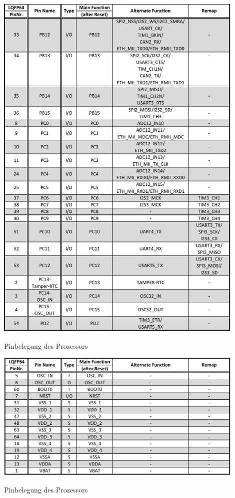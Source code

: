 \begin{table}[H]\ContinuedFloat
    \centering
    \includegraphics[width=0.9\textwidth]{Schuh/Pictures/Pinbelegung3}
    \caption[Pinbelegung des Prozessors]{Pinbelegung des Prozessors \cite{stm:stm32f107rc}}
\end{table}
\begin{table}[H]\ContinuedFloat
    \centering
    \includegraphics[width=0.9\textwidth]{Schuh/Pictures/Pinbelegung4}
    \caption[Pinbelegung des Prozessors]{Pinbelegung des Prozessors \cite{stm:stm32f107rc}}
\end{table}

